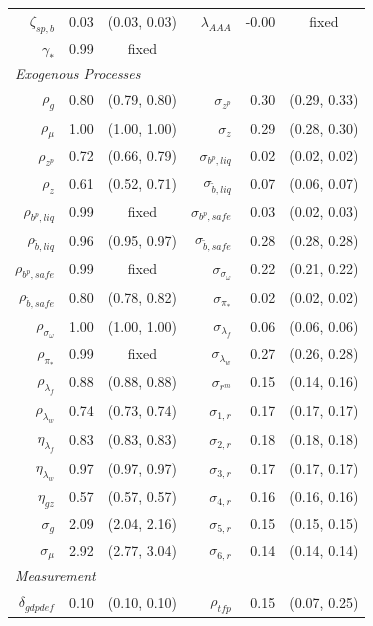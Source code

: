 \documentclass[12pt]{article}
\begin{document}
{\begin{longtable}{rrc@{\hspace{1in}}rrc}
$\zeta_{sp,b}$ & 0.03 & (0.03, 0.03) & $\lambda_{AAA}$ & -0.00 & \scriptsize{fixed} \\
$\gamma_*$ & 0.99 & \scriptsize{fixed} & & & \\[3pt]
\multicolumn{6}{l}{\textit{Exogenous Processes}} \\[3pt]
$\rho_g$ & 0.80 & (0.79, 0.80) & $\sigma_{z^p}$ & 0.30 & (0.29, 0.33) \\
$\rho_{\mu}$ & 1.00 & (1.00, 1.00) & $\sigma_{z}$ & 0.29 & (0.28, 0.30) \\
$\rho_{z^p}$ & 0.72 & (0.66, 0.79) & $\sigma_{b^p, liq}$ & 0.02 & (0.02, 0.02) \\
$\rho_z$ & 0.61 & (0.52, 0.71) & $\sigma_{\tilde{b}, liq}$ & 0.07 & (0.06, 0.07) \\
$\rho_{b^p,liq}$ & 0.99 & \scriptsize{fixed} & $\sigma_{b^p, safe}$ & 0.03 & (0.02, 0.03) \\
$\rho_{\tilde{b},liq}$ & 0.96 & (0.95, 0.97) & $\sigma_{\tilde{b}, safe}$ & 0.28 & (0.28, 0.28) \\
$\rho_{b^p,safe}$ & 0.99 & \scriptsize{fixed} & $\sigma_{\sigma_\omega}$ & 0.22 & (0.21, 0.22) \\
$\rho_{\tilde{b},safe}$ & 0.80 & (0.78, 0.82) & $\sigma_{\pi_*}$ & 0.02 & (0.02, 0.02) \\
$\rho_{\sigma_\omega}$ & 1.00 & (1.00, 1.00) & $\sigma_{\lambda_f}$ & 0.06 & (0.06, 0.06) \\
$\rho_{\pi_*}$ & 0.99 & \scriptsize{fixed} & $\sigma_{\lambda_w}$ & 0.27 & (0.26, 0.28) \\
$\rho_{\lambda_f}$ & 0.88 & (0.88, 0.88) & $\sigma_{r^m}$ & 0.15 & (0.14, 0.16) \\
$\rho_{\lambda_w}$ & 0.74 & (0.73, 0.74) & $\sigma_{1,r}$ & 0.17 & (0.17, 0.17) \\
$\eta_{\lambda_f}$ & 0.83 & (0.83, 0.83) & $\sigma_{2,r}$ & 0.18 & (0.18, 0.18) \\
$\eta_{\lambda_w}$ & 0.97 & (0.97, 0.97) & $\sigma_{3,r}$ & 0.17 & (0.17, 0.17) \\
$\eta_{gz}$ & 0.57 & (0.57, 0.57) & $\sigma_{4,r}$ & 0.16 & (0.16, 0.16) \\
$\sigma_{g}$ & 2.09 & (2.04, 2.16) & $\sigma_{5,r}$ & 0.15 & (0.15, 0.15) \\
$\sigma_{\mu}$ & 2.92 & (2.77, 3.04) & $\sigma_{6,r}$ & 0.14 & (0.14, 0.14) \\[3pt]
\multicolumn{6}{l}{\textit{Measurement}} \\[3pt]
$\delta_{gdpdef}$ & 0.10 & (0.10, 0.10) & $\rho_{tfp}$ & 0.15 & (0.07, 0.25) \\

\end{longtable}}
\end{document}
